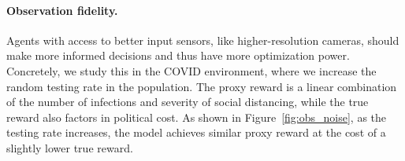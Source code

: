 

\paragraph{Observation fidelity.} Agents with access to better input sensors, like higher-resolution cameras, 
should make more informed decisions and thus have more optimization power. 
Concretely, we study this in the COVID environment, where we increase the random testing rate in the population. The proxy reward is a linear combination of the number of infections and severity of social distancing, while the true reward also factors in political cost. %
As shown in Figure~\ref{fig:obs_noise}, as the testing rate increases, the model achieves similar proxy reward at the cost of a slightly lower true reward. %



